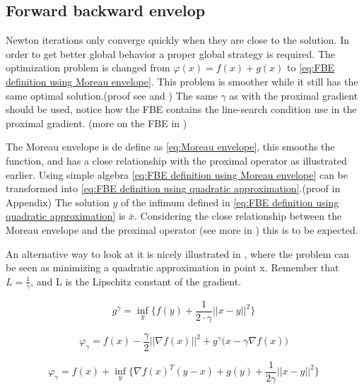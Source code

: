 	\subsection{Forward backward envelop}	
		Newton iterations only converge quickly when they are close to the solution. In order to get better global behavior a proper global strategy is required. The optimization problem is changed from $\varphi(x) = f(x) + g(x)$ to \eqref{eq:FBE definition using Moreau envelope}. This problem is smoother while it still has the same optimal solution.(proof see \cite{LorenzoStella2017} and \cite{Themelis}) The same $\gamma$ as with the proximal gradient should be used, notice how the FBE contains the line-search condition use in the proximal gradient. (more on the FBE in \cite{Themelis})
		
		The Moreau envelope is de define as \eqref{eq:Moreau envelope}, this smooths the function, and has a close relationship with the proximal operator as illustrated earlier. Using simple algebra \eqref{eq:FBE definition using Moreau envelope} can be transformed into \eqref{eq:FBE definition using quadratic approximation}.(proof in Appendix) The solution $y$ of the infimum defined in \eqref{eq:FBE definition using quadratic approximation} is $\bar{x}$. Considering the close relationship between the Moreau envelope and the proximal operator (see more in \cite{Themelis}) this is to be expected.
		
		An alternative way to look at it is nicely illustrated in \cite{AjaySathya2017}, where the problem can be seen as minimizing a quadratic approximation in point x.  Remember that $L = \frac{1}{\gamma}$, and L is the Lipschitz constant of the gradient.
		
		\begin{equation}
			g^{\gamma} = \underset{y}{\inf} \big \{f(y)+\frac{1}{2 \cdot \gamma}||x-y||^2 \big \}
			\label{eq:Moreau envelope}
		\end{equation}
		
		\begin{equation}
		\varphi_{\gamma} = f(x) - \frac{\gamma}{2}||\nabla f(x)||^2 + g^{\gamma} \big(x-\gamma \nabla f(x) \big)
		\label{eq:FBE definition using Moreau envelope}
		\end{equation}
		
		\begin{equation}
		\varphi_{\gamma} =   f(x) + \underset{y}{\inf} \Big\{ \nabla f(x)^T(y-x) + g(y) + \frac{1}{2 \gamma} ||x-y||^2  \Big\}
		\label{eq:FBE definition using quadratic approximation}
		\end{equation}
		
